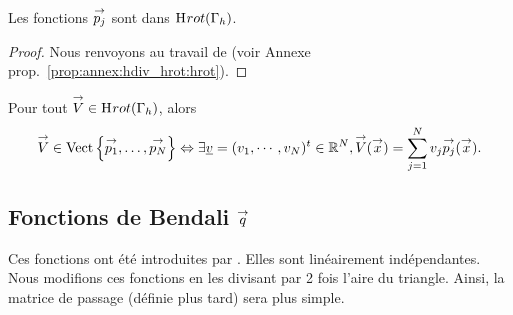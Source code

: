     \begin{prop}
      Les fonctions \({\overset{\rightarrow}{p_j}}\) sont dans \(\mathrm{H}_\mathrm{{}}{rot}(\Gamma_h)\).
    \end{prop}
    \begin{proof}
      Nous renvoyons au travail de \cite{nedelec_mixed_1980} (voir Annexe prop.~\ref{prop:annex:hdiv_hrot:hrot}).
    \end{proof}


    \begin{defn}
      Pour tout \({\overset{\rightarrow}{V}} \in \mathrm{H}_\mathrm{{}}{rot}(\Gamma_h)\), alors
      \begin{equation*}
        {\overset{\rightarrow}{V}} \in \operatorname{Vect}\left\lbrace{\overset{\rightarrow}{p_1}},\ldots,{\overset{\rightarrow}{p_N}}\right\rbrace \Leftrightarrow \exists {\underline{v}} = (v_1,\cdots,v_N)^t \in \mathbb R^N, {\overset{\rightarrow}{V}}({\overset{\rightarrow}{x}}) = \sum_{j=1}^N v_j {\overset{\rightarrow}{p_j}}({\overset{\rightarrow}{x}}).
      \end{equation*}
    \end{defn}

  \subsection[Fonctions de Bendali q]{Fonctions de Bendali \({\overset{\rightarrow}{q}}\)}

    Ces fonctions ont été introduites par \cite[eq.~28]{bendali_boundary-element_1999}. Elles sont linéairement indépendantes. Nous modifions ces fonctions en les divisant par 2 fois l'aire du triangle. Ainsi, la matrice de passage (définie plus tard) sera plus simple.


